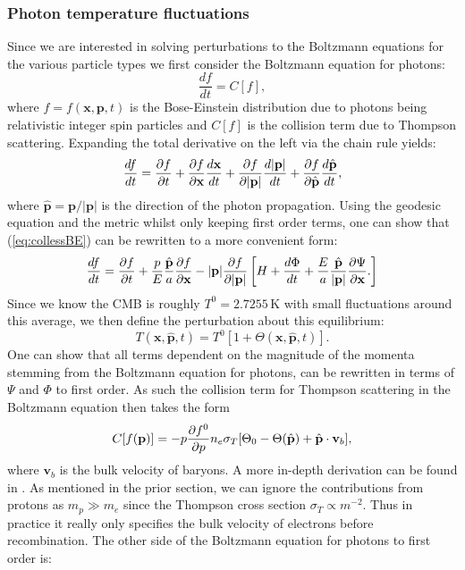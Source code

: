\documentclass[%
reprint,
 amsmath,amssymb,
 aps,
]{revtex4-2}
\begin{document}
\subsubsection{Photon temperature fluctuations}
Since we are interested in solving perturbations to the Boltzmann equations for the various particle types we first consider the Boltzmann equation for photons:
\[\frac{df}{dt}=C[f],\]
where $f=f(\textbf{x},\textbf{p},t)$ is the Bose-Einstein distribution due to photons being relativistic integer spin particles and $C[f]$ is the collision term due to Thompson scattering. Expanding the total derivative on the left via the chain rule yields:
\begin{equation}
	\frac{df}{dt}=\pdv{f}{t}+\pdv{f}{\textbf{x}}\frac{d\textbf{x}}{dt}+\pdv{f}{|\textbf{p}|}\frac{d|\textbf{p}|}{dt}+\pdv{f}{\hat{\textbf{p}}}\frac{d\hat{\textbf{p}}}{dt},
	\label{eq:collessBE}
\end{equation}
where $\hat{\textbf{p}}=\textbf{p}/|\textbf{p}|$ is the direction of the photon propagation. Using the geodesic equation and the metric whilst only keeping first order terms, one can show that (\ref{eq:collessBE}) can be rewritten to a more convenient form:
\begin{align*}
	\frac{df}{dt}=\pdv{f}{t}+\frac{p}{E}\frac{\hat{\textbf{p}}}{a}\pdv{f}{\textbf{x}}-|\textbf{p}|\pdv{f}{|\textbf{p}|}\left[H+\frac{d\Phi}{dt}+\frac{E}{a}\frac{\hat{\textbf{p}}}{|\textbf{p}|}\pdv{\Psi}{\textbf{x}}.\right]
\end{align*}
Since we know the CMB is roughly $T^{0}=2.7255\,$K with small fluctuations around this average, we then define the perturbation about this equilibrium:
\[T(\textbf{x},\hat{\textbf{p}},t)=T^{0}[1+\Theta(\textbf{x},\hat{\textbf{p}},t)].\]
One can show that all terms dependent on the magnitude of the momenta stemming from the Boltzmann equation for photons, can be rewritten in terms of $\Psi$ and $\Phi$ to first order.  As such the collision term for Thompson scattering in the Boltzmann equation then takes the form
\begin{equation}
	C[f(\textbf{p})]=-p\pdv{f^{0}}{p}n_e\sigma_T[\Theta_0-\Theta(\hat {\textbf{p}})+\hat{\textbf{p}}\cdot\textbf{v}_b],
	\label{eq:BEgammaR}
\end{equation}
where $\textbf{v}_b$ is the bulk velocity of baryons. A more in-depth derivation can be found in \cite{Dodelson:2003ft}. As mentioned in the prior section, we can ignore the contributions from protons as $m_p\gg m_e$ since the Thompson cross section $\sigma_T\propto m^{-2}$. Thus in practice it really only specifies the bulk velocity of electrons before recombination. The other side of the Boltzmann equation for photons to first order is:
\end{document}
